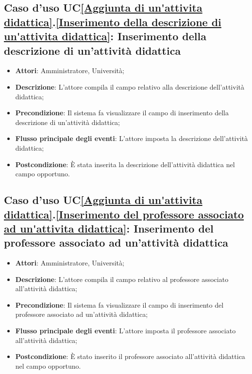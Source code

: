 \subsection{Caso d'uso UC\ref{Aggiunta di un'attivita didattica}.\ref{Inserimento della descrizione di un'attivita didattica}: Inserimento della descrizione di un'attività didattica}
\begin{itemize}
	\item \textbf{Attori}: Amministratore, Università;
	\item \textbf{Descrizione}: L'attore compila il campo relativo alla descrizione dell'attività didattica;
	
	\item \textbf{Precondizione}: Il sistema fa visualizzare il campo di inserimento della descrizione di un'attività didattica;
	
	\item \textbf{Flusso principale degli eventi}: L'attore imposta la descrizione dell'attività didattica;
	
	\item \textbf{Postcondizione}: È stata inserita la descrizione dell'attività didattica nel campo opportuno.
	
\end{itemize}


\subsection{Caso d'uso UC\ref{Aggiunta di un'attivita didattica}.\ref{Inserimento del professore associato ad un'attivita didattica}: Inserimento del professore associato ad un'attività didattica}
\begin{itemize}
	\item \textbf{Attori}: Amministratore, Università;
	\item \textbf{Descrizione}: L'attore compila il campo relativo al professore associato all'attività didattica;
	
	\item \textbf{Precondizione}: Il sistema fa visualizzare il campo di inserimento del professore associato ad un'attività didattica;
	\item \textbf{Flusso principale degli eventi}: L'attore imposta il professore associato all'attività didattica;
	
	\item \textbf{Postcondizione}: È stato inserito il professore associato all'attività didattica nel campo opportuno.
	
\end{itemize}

